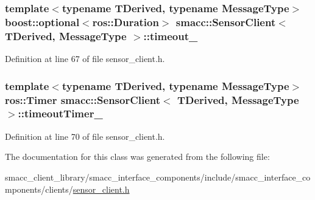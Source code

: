 \subsubsection[{\texorpdfstring{timeout\+\_\+}{timeout_}}]{\setlength{\rightskip}{0pt plus 5cm}template$<$typename T\+Derived, typename Message\+Type$>$ boost\+::optional$<$ros\+::\+Duration$>$ {\bf smacc\+::\+Sensor\+Client}$<$ T\+Derived, Message\+Type $>$\+::timeout\+\_\+}\hypertarget{classsmacc_1_1SensorClient_a1ad0b539c7ffa85327b3fb0e2bb1a6c3}{}\label{classsmacc_1_1SensorClient_a1ad0b539c7ffa85327b3fb0e2bb1a6c3}


Definition at line 67 of file sensor\+\_\+client.\+h.

\subsubsection[{\texorpdfstring{timeout\+Timer\+\_\+}{timeoutTimer_}}]{\setlength{\rightskip}{0pt plus 5cm}template$<$typename T\+Derived, typename Message\+Type$>$ ros\+::\+Timer {\bf smacc\+::\+Sensor\+Client}$<$ T\+Derived, Message\+Type $>$\+::timeout\+Timer\+\_\+\hspace{0.3cm}{\ttfamily [private]}}\hypertarget{classsmacc_1_1SensorClient_a9f4a565b9a082711da9bcbc2b8e15df1}{}\label{classsmacc_1_1SensorClient_a9f4a565b9a082711da9bcbc2b8e15df1}


Definition at line 70 of file sensor\+\_\+client.\+h.



The documentation for this class was generated from the following file\+:\begin{DoxyCompactItemize}
\item 
smacc\+\_\+client\+\_\+library/smacc\+\_\+interface\+\_\+components/include/smacc\+\_\+interface\+\_\+components/clients/\hyperlink{sensor__client_8h}{sensor\+\_\+client.\+h}\end{DoxyCompactItemize}
